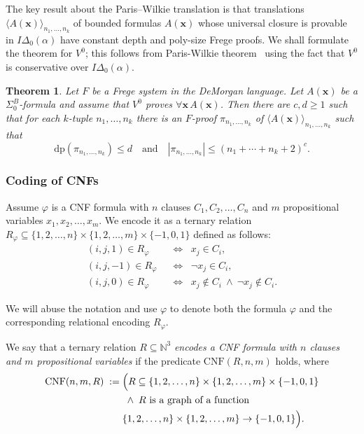 \documentclass{article}
\theoremstyle{plain}
\newtheorem{theorem}{Theorem}[section]
\theoremstyle{definition}
\newcommand{\tuple}{\mathbf}
\begin{document}
The key result about the Paris–Wilkie translation is that translations \linebreak $\langle A(\tuple{x}) \rangle_{n_1, \ldots, n_k}$
of bounded formulas $A(\tuple{x})$ whose universal closure is provable in $I\Delta_0(\alpha)$ have constant depth and poly-size Frege proofs. We shall formulate the theorem for $V^0$; this follows from Paris-Wilkie theorem~\cite{ParisWilkie1985} 
using the fact that $V^0$ is conservative over $I\Delta_0(\alpha)$.

\begin{theorem}\label{thm:paris_wilkie_v0}
Let $F$ be a Frege system in the DeMorgan language. Let $A(\tuple{x})$ be a $\Sigma^B_0$-formula and assume that $V^0$ proves $\forall \tuple{x}\, A(\tuple{x})$. Then there are $c, d \ge 1$ such that for each $k$-tuple $n_1, \ldots, n_k$ there is an $F$-proof $\pi_{n_1, \ldots, n_k}$ of $\langle A(\tuple{x}) \rangle_{n_1, \ldots, n_k}$ such that
\[
\mathrm{dp}(\pi_{n_1, \ldots, n_k}) \le d 
\quad \text{and} \quad
|\pi_{n_1, \ldots, n_k}| \le (n_1 + \cdots + n_k + 2)^c.
\]
\end{theorem}


\subsubsection{Coding of CNFs}\label{subsub:coding_cnfs}
Assume $\varphi$ is a CNF formula with $n$ clauses $C_1, C_2, \dots, C_{n}$ and $m$ propositional variables $x_1, x_2, \dots, x_{m}$. We encode it as a ternary relation $R_\varphi \subseteq \{1, 2, \dots, n\} \times \{1, 2, \dots, m\} \times \{-1, 0, 1\}$ defined as follows:
\begin{align*}
(i,j,1) \in R_\varphi &\;\;\Longleftrightarrow\;\; x_j \in C_i, \\
(i,j,-1) \in R_\varphi &\;\;\Longleftrightarrow\;\; \neg x_j \in C_i, \\
(i,j,0) \in R_\varphi &\;\;\Longleftrightarrow\;\; x_j \notin C_i \ \wedge\ \neg x_j \notin C_i .
\end{align*}

We will abuse the notation and use $\varphi$ to denote both the formula $\varphi$ and the corresponding relational encoding $R_\varphi$.

We say that a ternary relation $R \subseteq \mathbb{N}^3$
\emph{encodes a CNF formula with $n$ clauses and $m$ propositional variables}
if the predicate $\mathrm{CNF}(R,n,m)$ holds, where
\begin{align*}
\mathrm{CNF}(n,m,R) \;:=\; &
\Bigl(
R \subseteq \{1, 2, \dots, n\} \times \{1, 2, \dots, m\}\times\{-1,0,1\} \\ &
\;\wedge\;
R \text{ is a graph of a function }  \\&\{1, 2, \dots, n\} \times \{1, 2, \dots, m\} \rightarrow \{-1, 0, 1\}
\Bigr).
\end{align*}
\end{document}
